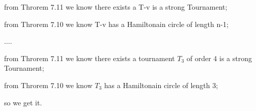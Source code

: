\documentclass[a4paper,UTF8]{article}
\theoremstyle{definition}
\begin{document}
from Throrem 7.11 we know there exists a T-v is a strong Tournament;

from Throrem 7.10 we know T-v has a Hamiltonain circle of length n-1;

....

from Throrem 7.11 we know there exists a tournament $T_3$ of order 4 is a strong Tournament;

from Throrem 7.10 we know $T_3$ has a Hamiltonain circle of length 3;

so we get it.
\end{document}
